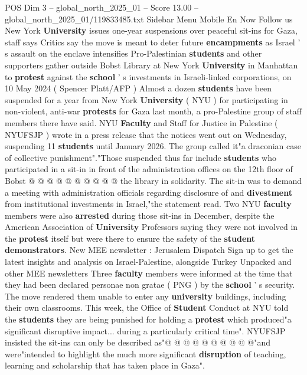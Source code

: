 \begin{textsample}{POS Dim 3 – global\_north\_2025\_01 – Score 13.00 – global\_north\_2025\_01/119833485.txt}  \label{ex:f3_pos_248}
Sidebar Menu Mobile En Now Follow us New York \textbf{University} issues one-year suspensions over peaceful sit-ins for Gaza, staff says Critics say the move is meant to deter future \textbf{encampments} as Israel ' s assault on the enclave intensifies Pro-Palestinian \textbf{students} and other supporters gather outside Bobst Library at New York \textbf{University} in Manhattan to \textbf{protest} against the \textbf{school} ' s investments in Israeli-linked corporations, on 10 May 2024 ( Spencer Platt/AFP ) Almost a dozen \textbf{students} have been suspended for a year from New York \textbf{University} ( NYU ) for participating in non-violent, anti-war \textbf{protests} for Gaza last month, a pro-Palestine group of staff members there have said.
NYU \textbf{Faculty} and Staff for Justice in Palestine ( NYUFSJP ) wrote in a press release that the notices went out on Wednesday, suspending 11 \textbf{students} until January 2026.
The group called it"a draconian case of collective punishment"."Those suspended thus far include \textbf{students} who participated in a sit-in in front of the administration offices on the 12th floor of Bobst @ @ @ @ @ @ @ @ @ @ the library in solidarity.
The sit-in was to demand a meeting with administration officials regarding disclosure of and \textbf{divestment} from institutional investments in Israel,"the statement read.
Two NYU \textbf{faculty} members were also \textbf{arrested} during those sit-ins in December, despite the American Association of \textbf{University} Professors saying they were not involved in the \textbf{protest} itself but were there to ensure the safety of the \textbf{student} \textbf{demonstrators}.
New MEE newsletter : Jerusalem Dispatch Sign up to get the latest insights and analysis on Israel-Palestine, alongside Turkey Unpacked and other MEE newsletters Three \textbf{faculty} members were informed at the time that they had been declared personae non gratae ( PNG ) by the \textbf{school} ' s security.
The move rendered them unable to enter any \textbf{university} buildings, including their own classrooms.
This week, the Office of \textbf{Student} Conduct at NYU told the \textbf{students} they are being punished for holding a \textbf{protest} which produced"a significant disruptive impact... during a particularly critical time".
NYUFSJP insisted the sit-ins can only be described as"@ @ @ @ @ @ @ @ @ @"and were"intended to highlight the much more significant \textbf{disruption} of teaching, learning and scholarship that has taken place in Gaza".

\end{textsample}
